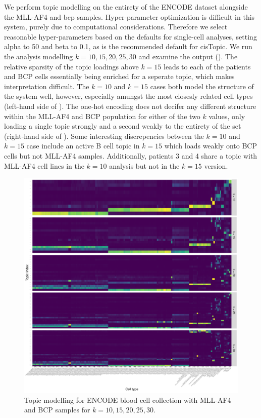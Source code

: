 We perform topic modelling on the entirety of the ENCODE dataset alongside the MLL-AF4 and \gls{bcp} samples. Hyper-parameter optimization is difficult in this system, purely due to computational considerations. Therefore we select reasonable hyper-parameters based on the defaults for single-cell analyses, setting alpha to 50 and beta to 0.1, as is the recommended default for cisTopic. We run the analysis modelling $k=10,15,20,25,30$ and examine the output (). The relative sparsity of the topic loadings above $k=15$ leads to each of the patients and BCP cells essentially being enriched for a seperate topic, which makes interpretation difficult. The $k=10$ and $k=15$ cases both model the structure of the system well, however, especially amungst the most closesly related cell types (left-hand side of ). The one-hot encoding does not decifer any different structure within the MLL-AF4 and BCP population for either of the two $k$ values, only loading a single topic strongly and a second weakly to the entirety of the set (right-hand side of ). Some interesting discrepencies between the $k=10$ and $k=15$ case include an active B cell topic in $k=15$ which loads weakly onto BCP cells but not MLL-AF4 samples. Additionally, patients 3 and 4 share a topic with MLL-AF4 cell lines in the $k=10$ analysis but not in the $k=15$ version.  


\begin{figure}
    \centering
    \includegraphics[width=\textwidth]{plot/ch5/mll_encode_all_topics.pdf}
    \caption{Topic modelling for ENCODE blood cell collection with MLL-AF4 and BCP samples for $k=10,15,20,25,30$. }
    \label{fig:encode_all}
\end{figure}

